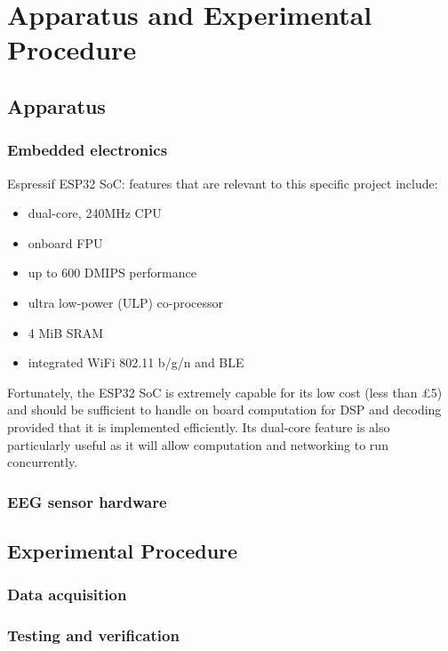 \chapter{Apparatus and Experimental Procedure}

\graphicspath{ {report/Chapter4/assets/} } 

\section{Apparatus}
\subsection{Embedded electronics}
Espressif ESP32 SoC: features that are relevant to this specific project include: 
\begin{itemize}
    \item dual-core, 240MHz CPU
    \item onboard FPU
    \item up to 600 DMIPS performance
    \item ultra low-power (ULP) co-processor
    \item 4 MiB SRAM
    \item integrated WiFi 802.11 b/g/n and BLE
\end{itemize}
Fortunately, the ESP32 SoC is extremely capable for its low cost (less than £5) and should be sufficient to handle on board computation for DSP and decoding provided that it is implemented efficiently. Its dual-core feature is also particularly useful as it will allow computation and networking to run concurrently. 
\subsection{EEG sensor hardware}

\section{Experimental Procedure}
\subsection{Data acquisition}
\subsection{Testing and verification}